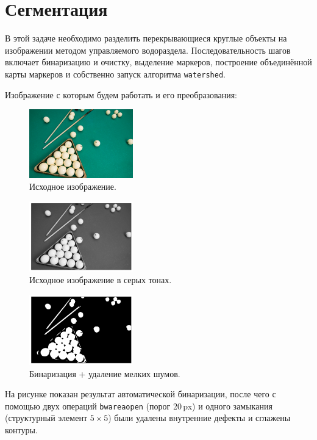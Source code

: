 \documentclass[a4paper,12pt]{article}
\begin{document}
\section{Сегментация}
В этой задаче необходимо разделить перекрывающиеся круглые объекты на изображении методом управляемого водораздела. Последовательность шагов включает бинаризацию и очистку, выделение маркеров, построение объединённой карты маркеров и собственно запуск алгоритма \texttt{watershed}. 

Изображение с которым будем работать и его преобразования:

\begin{figure}[H]
    \centering
    \includegraphics[width=0.4\textwidth]{images/balls.jpg}
    \caption{Исходное изображение.}
\end{figure}
\begin{figure}[H]
    \centering
    \includegraphics[width=0.4\textwidth]{result/3_grayscale.png}
    \caption{Исходное изображение в серых тонах.}
\end{figure}
\begin{figure}[H]
    \centering
    \includegraphics[width=0.4\textwidth]{result/3_bw_clean.png}
    \caption{Бинаризация + удаление мелких шумов.}
\end{figure}

На рисунке показан результат автоматической бинаризации, после чего с помощью двух операций \texttt{bwareaopen} (порог 20\,px) и одного замыкания (структурный элемент \(5\times5\)) были удалены внутренние дефекты и сглажены контуры.
\end{document}
